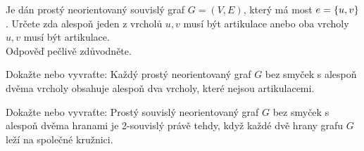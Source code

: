 \documentclass[11pt,a4paper]{article}
\begin{document}
\title{}
\author{Jakub Adamec\\XP01TGR}

\maketitle

\begin{exercise}
Je dán prostý neorientovaný souvislý graf $G = (V,E)$, který má most $e = \left\lbrace u,v \right\rbrace$. Určete zda alespoň jeden z vrcholů
$u,v$ musí být artikulace anebo oba vrcholy $u,v$ musí být artikulace.\\
Odpověď pečlivě zdůvodněte.
\end{exercise}

\begin{exercise}
Dokažte nebo vyvraťte: Každý prostý neorientovaný graf $G$ bez smyček s alespoň dvěma vrcholy obsahuje alespoň dva 
vrcholy, které nejsou artikulacemi.
\end{exercise}

\begin{exercise}
Dokažte nebo vyvraťte: Prostý souvislý neorientovaný graf $G$ bez smyček s alespoň dvěma hranami je 2-souvislý právě 
tehdy, když každé dvě hrany grafu $G$ leží na společné kružnici.
\end{exercise}
\end{document}
